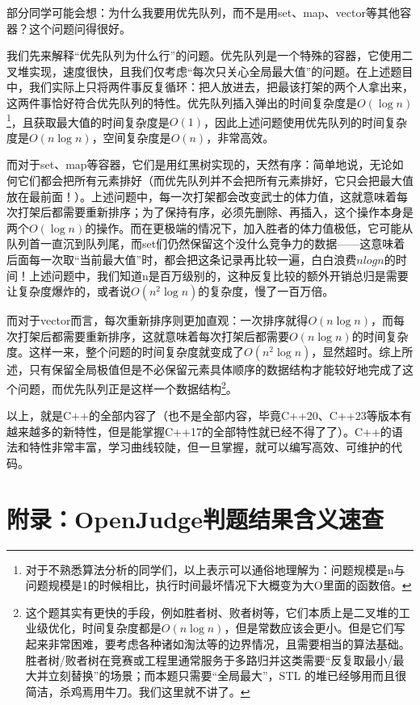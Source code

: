 \begin{note}
  部分同学可能会想：为什么我要用优先队列，而不是用set、map、vector等其他容器？这个问题问得很好。

  我们先来解释“优先队列为什么行”的问题。优先队列是一个特殊的容器，它使用二叉堆实现，速度很快，且我们仅考虑“每次只关心全局最大值”的问题。在上述题目中，我们实际上只将两件事反复循环：把人放进去，把最该打架的两个人拿出来，这两件事恰好符合优先队列的特性。优先队列插入弹出的时间复杂度是$O(\log n)$\footnote{对于不熟悉算法分析的同学们，以上表示可以通俗地理解为：问题规模是n与问题规模是1的时候相比，执行时间最坏情况下大概变为大O里面的函数倍。}，且获取最大值的时间复杂度是$O(1)$，因此上述问题使用优先队列的时间复杂度是$O(n \log n)$，空间复杂度是$O(n)$，非常高效。

  而对于set、map等容器，它们是用红黑树实现的，天然有序：简单地说，无论如何它们都会把所有元素排好（而优先队列并不会把所有元素排好，它只会把最大值放在最前面！）。上述问题中，每一次打架都会改变武士的体力值，这就意味着每次打架后都需要重新排序；为了保持有序，必须先删除、再插入，这个操作本身是两个$O(\log n)$的操作。而在更极端的情况下，加入胜者的体力值极低，它可能从队列首一直沉到队列尾，而set们仍然保留这个没什么竞争力的数据——这意味着后面每一次取“当前最大值”时，都会把这条记录再比较一遍，白白浪费$n log n $的时间！上述问题中，我们知道n是百万级别的，这种反复比较的额外开销总归是需要让复杂度爆炸的，或者说$O(n^2 \log n)$的复杂度，慢了一百万倍。

  而对于vector而言，每次重新排序则更加直观：一次排序就得$O(n \log n)$，而每次打架后都需要重新排序，这就意味着每次打架后都需要$O(n \log n)$的时间复杂度。这样一来，整个问题的时间复杂度就变成了$O(n^2 \log n)$，显然超时。综上所述，只有保留全局极值但是不必保留元素具体顺序的数据结构才能较好地完成了这个问题，而优先队列正是这样一个数据结构\footnote{这个题其实有更快的手段，例如胜者树、败者树等，它们本质上是二叉堆的工业级优化，时间复杂度都是$O(n \log n)$，但是常数应该会更小。但是它们写起来非常困难，要考虑各种诸如淘汰等的边界情况，且需要相当的算法基础。胜者树/败者树在竞赛或工程里通常服务于多路归并这类需要“反复取最小/最大并立刻替换”的场景；而本题只需要“全局最大”，STL 的堆已经够用而且很简洁，杀鸡焉用牛刀。我们这里就不讲了。}。
\end{note}

以上，就是C++的全部内容了（也不是全部内容，毕竟C++20、C++23等版本有越来越多的新特性，但是能掌握C++17的全部特性就已经不得了了）。C++的语法和特性非常丰富，学习曲线较陡，但一旦掌握，就可以编写高效、可维护的代码。

\section{附录：OpenJudge判题结果含义速查}

